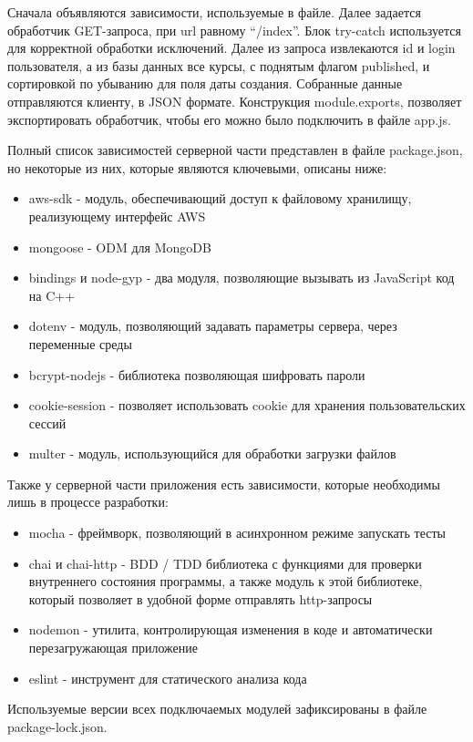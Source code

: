 \documentclass[%
  a5paper,
  subf,
  href,
  master,
  dotsinheaders 
]{csse-fcs}
\begin{document}
Сначала объявляются зависимости, используемые в файле. Далее задается обработчик GET-запроса, при url равному “/index”. Блок try-catch используется для корректной обработки исключений. Далее из запроса извлекаются id и login пользователя, а из базы данных все курсы, с поднятым флагом published, и сортировкой по убыванию для поля даты создания. Собранные данные отправляются клиенту, в JSON формате. Конструкция module.exports, позволяет экспортировать обработчик, чтобы его можно было подключить в файле app.js.

Полный список зависимостей серверной части представлен в файле package.json, но некоторые из них, которые являются ключевыми, описаны ниже:

\begin{itemize}
	\item aws-sdk - модуль, обеспечивающий доступ к файловому хранилищу, реализующему интерфейс AWS
	\item mongoose - ODM для MongoDB
	\item bindings и node-gyp - два модуля, позволяющие вызывать из JavaScript код на C++
	\item dotenv - модуль, позволяющий задавать параметры сервера, через переменные среды
	\item bcrypt-nodejs - библиотека позволяющая шифровать пароли
	\item cookie-session - позволяет использовать cookie для хранения пользовательских сессий
	\item multer - модуль, использующийся для обработки загрузки файлов
\end{itemize}

Также у серверной части приложения есть зависимости, которые необходимы лишь в процессе разработки:

\begin{itemize}
	\item mocha - фреймворк, позволяющий в асинхронном режиме запускать тесты
	\item chai и chai-http - BDD / TDD библиотека с функциями для проверки внутреннего состояния программы, а также модуль к этой библиотеке, который позволяет в удобной форме отправлять http-запросы
	\item nodemon - утилита, контролирующая изменения в коде и автоматически перезагружающая приложение
	\item eslint - инструмент для статического анализа кода
\end{itemize}

Используемые версии всех подключаемых модулей зафиксированы в файле package-lock.json.
\end{document}
